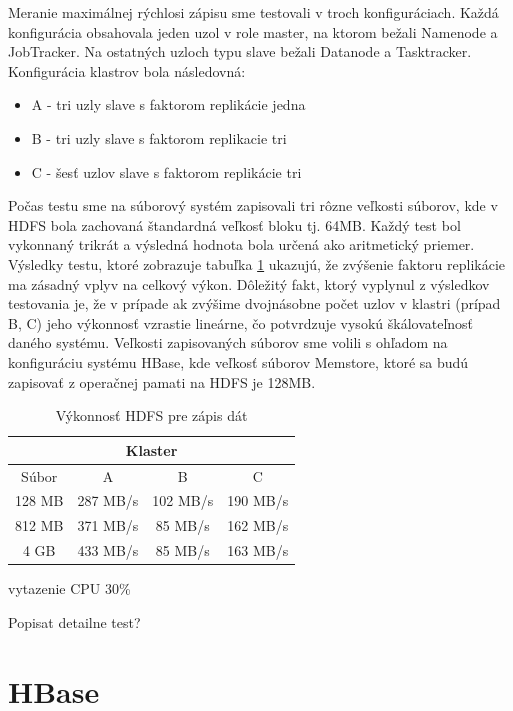 \documentclass[11pt,twoside,a4paper]{book}
\begin{document}
Meranie maximálnej rýchlosi zápisu sme testovali v troch konfiguráciach. Každá konfigurácia obsahovala jeden uzol v role master, na ktorom bežali Namenode a JobTracker. Na ostatných uzloch typu slave bežali Datanode a Tasktracker. Konfigurácia klastrov bola následovná:

\begin{itemize}
 \item A - tri uzly slave s faktorom replikácie jedna
 \item B - tri uzly slave s faktorom replikacie tri
 \item C - šesť uzlov slave s faktorom replikácie tri
\end{itemize}

Počas testu sme na súborový systém zapisovali tri rôzne veľkosti súborov, kde v HDFS bola zachovaná štandardná veľkosť bloku tj. 64MB. Každý test bol vykonnaný trikrát a výsledná hodnota bola určená ako aritmetický priemer. Výsledky testu, ktoré zobrazuje tabuľka \ref{tab:HDFSperformance} ukazujú, že zvýšenie faktoru replikácie ma zásadný vplyv na celkový výkon. Dôležitý fakt, ktorý vyplynul z výsledkov testovania je, že v prípade ak zvýšime dvojnásobne počet uzlov v klastri (prípad B, C) jeho výkonnosť vzrastie lineárne, čo potvrdzuje vysokú škálovateľnosť daného systému. Veľkosti zapisovaných súborov sme volili s ohľadom na konfiguráciu systému HBase, kde veľkosť súborov Memstore, ktoré sa budú zapisovať z operačnej pamati na HDFS je 128MB.
 

\begin{table}[htbp]
\begin{center}
\begin{tabular}{|c|c|c|c|}
\hline
\multicolumn{4}{|c|}{Klaster}  \\
\hline Súbor & A & B & C\\ 
\hline
\hline 128 MB & 287 MB/s& 102 MB/s& 190 MB/s\\ 
\hline 812 MB & 371 MB/s& 85 MB/s& 162 MB/s\\ 
\hline 4 GB & 433 MB/s& 85 MB/s& 163 MB/s\\ 
\hline
\end{tabular} 
\end{center}
\caption{Výkonnosť HDFS pre zápis dát}
\label{tab:HDFSperformance}
\end{table}

vytazenie CPU 30\%

Popisat detailne test?

\section{HBase}
\end{document}
